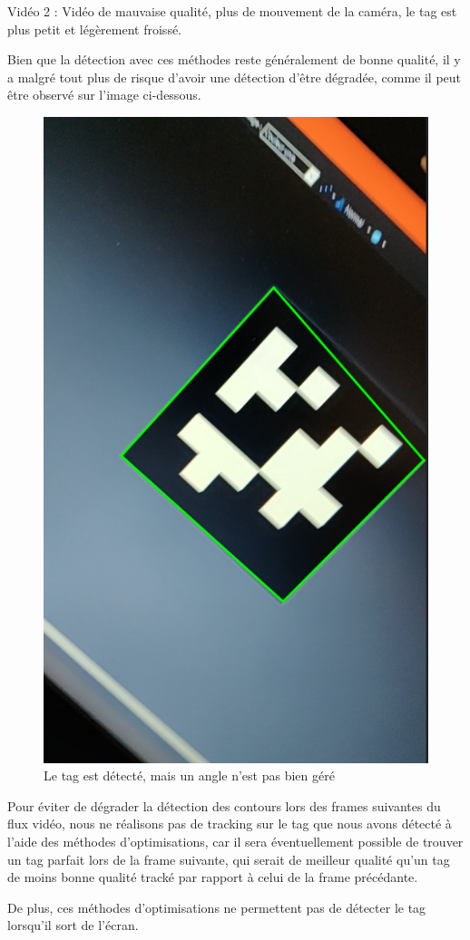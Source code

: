         Vidéo 2 : Vidéo de mauvaise qualité, plus de mouvement de la caméra, le tag est plus petit et légèrement froissé.

        Bien que la détection avec ces méthodes reste généralement de bonne qualité, il y a malgré tout plus de risque d'avoir une détection d'être dégradée, comme il peut être observé sur l'image ci-dessous.

        \begin{figure}[!h]
            \centering
            \includegraphics[scale=0.25]{img/cropped_tag.png}
            \caption{Le tag est détecté, mais un angle n'est pas bien géré}
        \end{figure}

        Pour éviter de dégrader la détection des contours lors des frames suivantes du flux vidéo, nous ne réalisons pas de tracking sur le tag que nous avons détecté à l'aide des méthodes d'optimisations, car il sera éventuellement possible de trouver un tag parfait lors de la frame suivante, qui serait de meilleur qualité qu'un tag de moins bonne qualité tracké par rapport à celui de la frame précédante.

        De plus, ces méthodes d'optimisations ne permettent pas de détecter le tag lorsqu'il sort de l'écran.